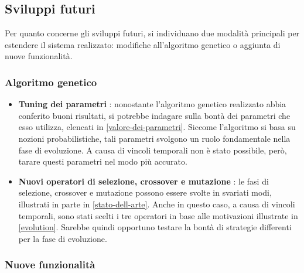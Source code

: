 \documentclass[a4paper,12pt]{article}
\begin{document}
\subsection*{Sviluppi futuri}

Per quanto concerne gli sviluppi futuri, si individuano due modalità principali per estendere il sistema realizzato: modifiche all'algoritmo genetico o aggiunta di nuove funzionalità.

\subsubsection*{Algoritmo genetico} 

\begin{itemize}
	\item \textbf{Tuning dei parametri} : nonostante l'algoritmo genetico realizzato abbia conferito buoni risultati, si potrebbe indagare sulla bontà dei parametri che esso utilizza, elencati in \autoref{valore-dei-parametri}. Siccome l'algoritmo si basa su nozioni probabilistiche, tali parametri svolgono un ruolo fondamentale nella fase di evoluzione. A causa di vincoli temporali non è stato possibile, però, tarare questi parametri nel modo più accurato.
	\item \textbf{Nuovi operatori di selezione, crossover e mutazione} : le fasi di selezione, crossover e mutazione possono essere svolte in svariati modi, illustrati in parte in \autoref{stato-dell-arte}. Anche in questo caso, a causa di vincoli temporali, sono stati scelti i tre operatori in base alle motivazioni illustrate in \autoref{evolution}. Sarebbe quindi opportuno testare la bontà di strategie differenti per la fase di evoluzione.
\end{itemize}
 

\subsubsection*{Nuove funzionalità}
\end{document}
